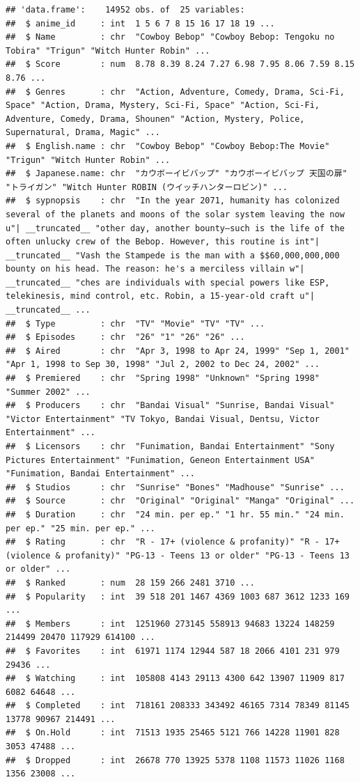 \documentclass[
]{article}
\begin{document}
\begin{verbatim}
## 'data.frame':    14952 obs. of  25 variables:
##  $ anime_id     : int  1 5 6 7 8 15 16 17 18 19 ...
##  $ Name         : chr  "Cowboy Bebop" "Cowboy Bebop: Tengoku no Tobira" "Trigun" "Witch Hunter Robin" ...
##  $ Score        : num  8.78 8.39 8.24 7.27 6.98 7.95 8.06 7.59 8.15 8.76 ...
##  $ Genres       : chr  "Action, Adventure, Comedy, Drama, Sci-Fi, Space" "Action, Drama, Mystery, Sci-Fi, Space" "Action, Sci-Fi, Adventure, Comedy, Drama, Shounen" "Action, Mystery, Police, Supernatural, Drama, Magic" ...
##  $ English.name : chr  "Cowboy Bebop" "Cowboy Bebop:The Movie" "Trigun" "Witch Hunter Robin" ...
##  $ Japanese.name: chr  "カウボーイビバップ" "カウボーイビバップ 天国の扉" "トライガン" "Witch Hunter ROBIN (ウイッチハンターロビン)" ...
##  $ sypnopsis    : chr  "In the year 2071, humanity has colonized several of the planets and moons of the solar system leaving the now u"| __truncated__ "other day, another bounty—such is the life of the often unlucky crew of the Bebop. However, this routine is int"| __truncated__ "Vash the Stampede is the man with a $$60,000,000,000 bounty on his head. The reason: he's a merciless villain w"| __truncated__ "ches are individuals with special powers like ESP, telekinesis, mind control, etc. Robin, a 15-year-old craft u"| __truncated__ ...
##  $ Type         : chr  "TV" "Movie" "TV" "TV" ...
##  $ Episodes     : chr  "26" "1" "26" "26" ...
##  $ Aired        : chr  "Apr 3, 1998 to Apr 24, 1999" "Sep 1, 2001" "Apr 1, 1998 to Sep 30, 1998" "Jul 2, 2002 to Dec 24, 2002" ...
##  $ Premiered    : chr  "Spring 1998" "Unknown" "Spring 1998" "Summer 2002" ...
##  $ Producers    : chr  "Bandai Visual" "Sunrise, Bandai Visual" "Victor Entertainment" "TV Tokyo, Bandai Visual, Dentsu, Victor Entertainment" ...
##  $ Licensors    : chr  "Funimation, Bandai Entertainment" "Sony Pictures Entertainment" "Funimation, Geneon Entertainment USA" "Funimation, Bandai Entertainment" ...
##  $ Studios      : chr  "Sunrise" "Bones" "Madhouse" "Sunrise" ...
##  $ Source       : chr  "Original" "Original" "Manga" "Original" ...
##  $ Duration     : chr  "24 min. per ep." "1 hr. 55 min." "24 min. per ep." "25 min. per ep." ...
##  $ Rating       : chr  "R - 17+ (violence & profanity)" "R - 17+ (violence & profanity)" "PG-13 - Teens 13 or older" "PG-13 - Teens 13 or older" ...
##  $ Ranked       : num  28 159 266 2481 3710 ...
##  $ Popularity   : int  39 518 201 1467 4369 1003 687 3612 1233 169 ...
##  $ Members      : int  1251960 273145 558913 94683 13224 148259 214499 20470 117929 614100 ...
##  $ Favorites    : int  61971 1174 12944 587 18 2066 4101 231 979 29436 ...
##  $ Watching     : int  105808 4143 29113 4300 642 13907 11909 817 6082 64648 ...
##  $ Completed    : int  718161 208333 343492 46165 7314 78349 81145 13778 90967 214491 ...
##  $ On.Hold      : int  71513 1935 25465 5121 766 14228 11901 828 3053 47488 ...
##  $ Dropped      : int  26678 770 13925 5378 1108 11573 11026 1168 1356 23008 ...
\end{verbatim}
\end{document}
